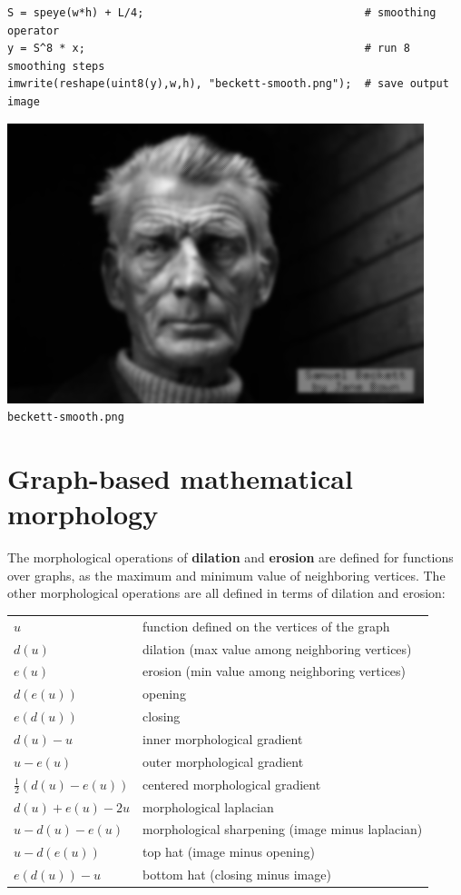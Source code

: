 \begin{verbatim}
S = speye(w*h) + L/4;                                  # smoothing operator
y = S^8 * x;                                           # run 8 smoothing steps
imwrite(reshape(uint8(y),w,h), "beckett-smooth.png");  # save output image
\end{verbatim}

\includegraphics{beckett-smooth.png}
\verb+beckett-smooth.png+

\section{Graph-based mathematical morphology}

The morphological operations of {\bf dilation} and {\bf erosion} are
defined for functions over graphs, as the maximum and minimum value of
neighboring vertices.  The other morphological operations are all defined in
terms of dilation and erosion:

\begin{tabular}{ll}
	$u$ & function defined on the vertices of the graph \\
	$d(u)$ & dilation (max value among neighboring vertices) \\
	$e(u)$ & erosion (min value among neighboring vertices) \\
	$d(e(u))$ & opening \\
	$e(d(u))$ & closing \\
	$d(u) - u$ & inner morphological gradient \\
	$u - e(u)$ & outer morphological gradient \\
	$\frac{1}{2}(d(u) - e(u))$ & centered morphological gradient \\
	$d(u) + e(u) - 2u$ & morphological laplacian \\
	$u - d(u) - e(u)$ & morphological sharpening (image minus laplacian) \\
	$u - d(e(u))$ & top hat (image minus opening) \\
	$e(d(u)) -u$ & bottom hat (closing minus image) \\
\end{tabular}

